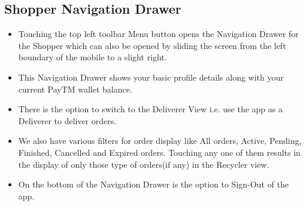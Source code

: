 \documentclass{report}
\begin{document}
\subsection{Shopper Navigation Drawer}
\begin{itemize}
\item Touching the top left toolbar Menu button opens the Navigation Drawer for the Shopper which can also be opened by sliding the screen from the left boundary of the mobile to a slight right.
\item This Navigation Drawer shows your basic profile details along with your current PayTM wallet balance.
\item There is the option to switch to the Deliverer View i.e. use the app as a Deliverer to deliver orders.
\item We also have various filters for order display like All orders, Active, Pending, Finished, Cancelled and Expired orders. Touching any one of them results in the display of only those type of orders(if any) in the Recycler view.
\item On the bottom of the Navigation Drawer is the option to Sign-Out of the app.
\end{itemize}
\end{document}
